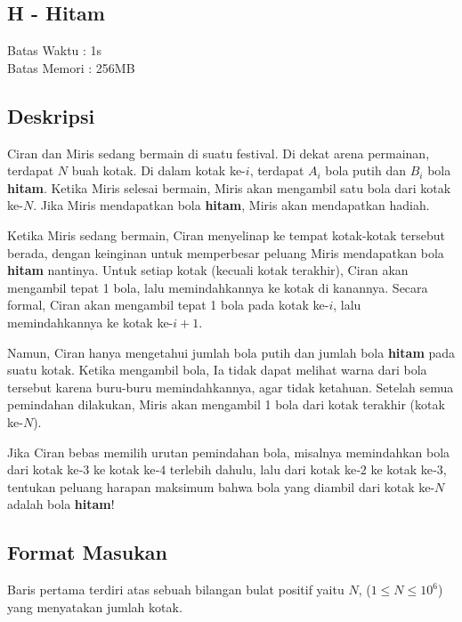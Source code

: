 \documentclass{article}
\begin{document}
\begin{center}
    \section*{H - \textbf{Hitam}} %
    Batas Waktu : 1s \\  %
    Batas Memori :  256MB \\ %
\end{center}

\subsection*{Deskripsi}

Ciran dan Miris sedang bermain di suatu festival. Di dekat arena permainan, terdapat $N$ buah kotak. Di dalam kotak ke-$i$, terdapat $A_i$ bola putih dan $B_i$ bola \textbf{hitam}. Ketika Miris selesai bermain, Miris akan mengambil satu bola dari kotak ke-$N$. Jika Miris mendapatkan bola \textbf{hitam}, Miris akan mendapatkan hadiah. 

Ketika Miris sedang bermain, Ciran menyelinap ke tempat kotak-kotak tersebut berada, dengan keinginan untuk memperbesar peluang Miris mendapatkan bola \textbf{hitam} nantinya. Untuk setiap kotak (kecuali kotak terakhir), Ciran akan mengambil tepat 1 bola, lalu memindahkannya ke kotak di kanannya. Secara formal, Ciran akan mengambil tepat 1 bola pada kotak ke-$i$, lalu memindahkannya ke kotak ke-$i+1$. 

Namun, Ciran hanya mengetahui jumlah bola putih dan jumlah bola \textbf{hitam} pada suatu kotak. Ketika mengambil bola, Ia tidak dapat melihat warna dari bola tersebut karena buru-buru memindahkannya, agar tidak ketahuan. Setelah semua pemindahan dilakukan, Miris akan mengambil 1 bola dari kotak terakhir (kotak ke-$N$).

Jika Ciran bebas memilih urutan pemindahan bola, misalnya memindahkan bola dari kotak ke‑$3$ ke kotak ke‑$4$ terlebih dahulu, lalu dari kotak ke‑$2$ ke kotak ke‑$3$, tentukan peluang harapan maksimum bahwa bola yang diambil dari kotak ke-$N$ adalah bola \textbf{hitam}!

\subsection*{Format Masukan}

Baris pertama terdiri atas sebuah bilangan bulat positif yaitu $N$, ($1 \leq N \leq 10^6$) yang menyatakan jumlah kotak.
\end{document}
